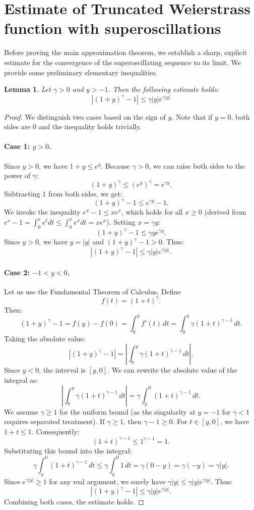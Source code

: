 \documentclass[reqno,11pt]{amsart}
\newtheorem{lemma}[theorem]{Lemma}
\theoremstyle{definition}
\begin{document}
\section{Estimate of Truncated Weierstrass function with superoscillations} \label{sec:global_error}



Before proving the main approximation theorem, we establish a sharp, explicit estimate for the convergence of the superoscillating sequence to its limit.
We provide some preliminary elementary inequalities.

\begin{lemma}
Let $\gamma > 0$ and $y > -1$. Then the following estimate holds:
\[
|(1+y)^\gamma - 1| \leq \gamma |y| e^{\gamma |y|}
\]
\end{lemma}

\begin{proof}
We distinguish two cases based on the sign of $y$. Note that if $y=0$, both sides are 0 and the inequality holds trivially.

\paragraph{Case 1: $y > 0$.}
Since $y > 0$, we have $1+y \leq e^y$. Because $\gamma > 0$, we can raise both sides to the power of $\gamma$:
\[
(1+y)^\gamma \leq (e^y)^\gamma = e^{\gamma y}.
\]
Subtracting $1$ from both sides, we get:
\[
(1+y)^\gamma - 1 \leq e^{\gamma y} - 1.
\]
We invoke the inequality $e^x - 1 \leq x e^x$, which holds for all $x \geq 0$ (derived from $e^x - 1 = \int_0^x e^t dt \leq \int_0^x e^x dt = x e^x$). Setting $x = \gamma y$:
\[
(1+y)^\gamma - 1 \leq \gamma y e^{\gamma y}.
\]
Since $y > 0$, we have $y = |y|$ and $(1+y)^\gamma - 1 > 0$. Thus:
\[
|(1+y)^\gamma - 1| \leq \gamma |y| e^{\gamma |y|}.
\]

\paragraph{Case 2: $-1 < y < 0$.}
Let us use the Fundamental Theorem of Calculus. Define
$$f(t) = (1+t)^\gamma.
$$ Then:
\[
(1+y)^\gamma - 1 = f(y) - f(0) = \int_0^y f'(t) \, dt = \int_0^y \gamma(1+t)^{\gamma-1} \, dt.
\]
Taking the absolute value:
\[
|(1+y)^\gamma - 1| = \left| \int_0^y \gamma(1+t)^{\gamma-1} \, dt \right|.
\]
Since $y < 0$, the interval is $[y, 0]$. We can rewrite the absolute value of the integral as:
\[
\left| \int_0^y \gamma(1+t)^{\gamma-1} \, dt \right| = \gamma \int_y^0 (1+t)^{\gamma-1} \, dt.
\]
We assume $\gamma \geq 1$ for the uniform bound (as the singularity at $y=-1$ for $\gamma < 1$ requires separated treatment). If $\gamma \geq 1$, then $\gamma - 1 \geq 0$. For $t \in [y, 0]$, we have $1+t \leq 1$. Consequently:
\[
(1+t)^{\gamma-1} \leq 1^{\gamma-1} = 1.
\]
Substituting this bound into the integral:
\[
\gamma \int_y^0 (1+t)^{\gamma-1} \, dt \leq \gamma \int_y^0 1 \, dt = \gamma (0 - y) = \gamma (-y) = \gamma |y|.
\]
Since $e^{\gamma|y|} \geq 1$ for any real argument, we surely have $\gamma |y| \leq \gamma |y| e^{\gamma |y|}$. Thus:
\[
|(1+y)^\gamma - 1| \leq \gamma |y| e^{\gamma |y|}.
\]
Combining both cases, the estimate holds.
\end{proof}
\end{document}
